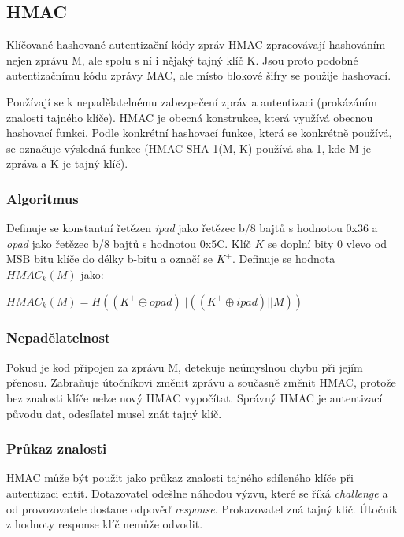 \documentclass{szzclass}
\begin{document}
\subsection{HMAC}
Klíčované hashované autentizační kódy zpráv HMAC zpracovávají hashováním nejen zprávu M, ale spolu s ní i nějaký tajný klíč K.
Jsou proto podobné autentizačnímu kódu zprávy MAC, ale místo blokové šifry se použije hashovací.

Používají se k nepadělatelnému zabezpečení zpráv a autentizaci (prokázáním znalosti tajného klíče). HMAC je obecná konstrukce, která využívá obecnou hashovací funkci.
Podle konkrétní hashovací funkce, která se konkrétně používá, se označuje výsledná funkce (HMAC-SHA-1(M, K) používá sha-1, kde M je zpráva a K je tajný klíč).
\subsubsection{Algoritmus}
Definuje se konstantní řetězen \textit{ipad} jako řetězec b/8 bajtů s hodnotou 0x36 a \textit{opad} jako řetězec b/8 bajtů s hodnotou 0x5C.
Klíč $K$ se doplní bity 0 vlevo od MSB bitu klíče do délky b-bitu a označí se $K^+$. Definuje se hodnota $HMAC_k(M)$ jako:
\begin{center}
$HMAC_k(M) = H((K^+ \oplus opad)||((K^+ \oplus ipad)||M))$
\end{center}
\subsubsection{Nepadělatelnost}
Pokud je kod připojen za zprávu M, detekuje neúmyslnou chybu při jejím přenosu. Zabraňuje útočníkovi změnit zprávu a současně změnit HMAC, protože
bez znalosti klíče nelze nový HMAC vypočítat. Správný HMAC je autentizací původu dat, odesílatel musel znát tajný klíč.
\subsubsection{Průkaz znalosti}
HMAC může být použit jako průkaz znalosti tajného sdíleného klíče při autentizaci entit. Dotazovatel odešlne náhodou výzvu, které se říká \textit{challenge}
a od provozovatele dostane odpověď \textit{response}. Prokazovatel zná tajný klíč. Útočník z hodnoty response klíč nemůže odvodit.
\end{document}
